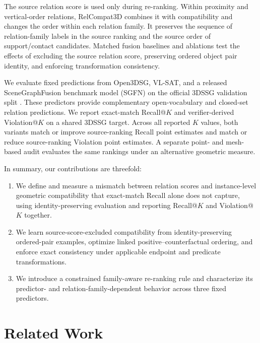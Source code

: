 The source relation score is used only during re-ranking. Within proximity and vertical-order relations, RelCompat3D combines it with compatibility and changes the order within each relation family. It preserves the sequence of relation-family labels in the source ranking and the source order of support/contact candidates. Matched fusion baselines and ablations test the effects of excluding the source relation score, preserving ordered object pair identity, and enforcing transformation consistency. 

We evaluate fixed predictions from Open3DSG, VL-SAT, and a released SceneGraphFusion benchmark model (SGFN) on the official 3DSSG validation split \cite{wang2023vl,koch2024open3dsg,wu2021scenegraphfusion}. These predictors provide complementary open-vocabulary and closed-set relation predictions. We report exact-match Recall@$K$ and verifier-derived Violation@$K$ on a shared 3DSSG target. Across all reported $K$ values, both variants match or improve source-ranking Recall point estimates and match or reduce source-ranking Violation point estimates. A separate point- and mesh-based audit evaluates the same rankings under an alternative geometric measure. 

In summary, our contributions are threefold:
\begin{enumerate}
    \item We define and measure a mismatch between relation scores and instance-level geometric compatibility that exact-match Recall alone does not capture, using identity-preserving evaluation and reporting Recall@$K$ and Violation@$K$ together. 
    \item We learn source-score-excluded compatibility from identity-preserving ordered-pair examples, optimize linked positive--counterfactual ordering, and enforce exact consistency under applicable endpoint and predicate transformations.
    \item We introduce a constrained family-aware re-ranking rule and characterize its predictor- and relation-family-dependent behavior across three fixed predictors.
\end{enumerate}


\section{Related Work}
